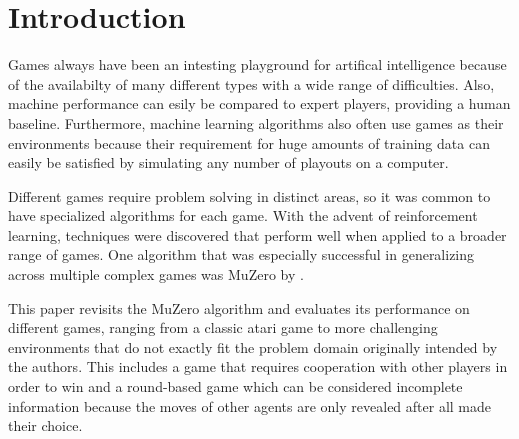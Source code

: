 \chapter{Introduction}

Games always have been an intesting playground for artifical intelligence because of the
availabilty of many different types with a wide range of difficulties.
Also, machine performance can esily be compared to expert players, providing a human
baseline.
Furthermore, machine learning algorithms also often use games as their environments
because their requirement for huge amounts of training data can easily be satisfied by
simulating any number of playouts on a computer.

Different games require problem solving in distinct areas, so it was common to have
specialized algorithms for each game.
With the advent of reinforcement learning, techniques were discovered that perform well
when applied to a broader range of games.
One algorithm that was especially successful in generalizing across multiple complex games
was MuZero\cite{muzero} by \citeauthor{muzero}.

This paper revisits the MuZero algorithm and evaluates its performance on different games,
ranging from a classic atari game to more challenging environments that do not exactly fit
the problem domain originally intended by the authors.
This includes a game that requires cooperation with other players in order to win and a
round-based game which can be considered incomplete information because the moves of other
agents are only revealed after all made their choice.

